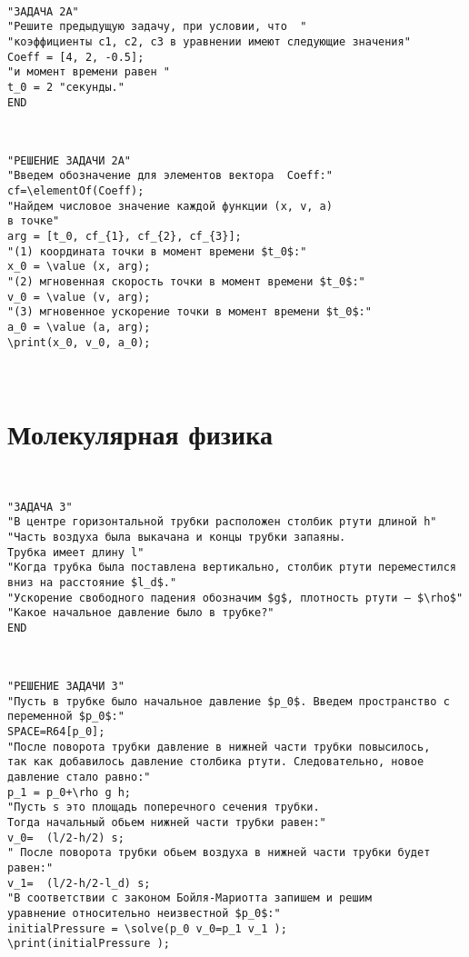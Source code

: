 \

\begin{verbatim}
"ЗАДАЧА 2А"
"Решите предыдущую задачу, при условии, что  "
"коэффициенты c1, c2, c3 в уравнении имеют следующие значения"
Coeff = [4, 2, -0.5];
"и момент времени равен "
t_0 = 2 "секунды." 
END
\end{verbatim}\vspace*{-3mm}

\

\begin{verbatim}
"РЕШЕНИЕ ЗАДАЧИ 2А"
"Введем обозначение для элементов вектора  Coeff:"
cf=\elementOf(Coeff);
"Найдем числовое значение каждой функции (x, v, a)
в точке"
arg = [t_0, cf_{1}, cf_{2}, cf_{3}];
"(1) координата точки в момент времени $t_0$:"
x_0 = \value (x, arg);
"(2) мгновенная скорость точки в момент времени $t_0$:"
v_0 = \value (v, arg);
"(3) мгновенное ускорение точки в момент времени $t_0$:"
a_0 = \value (a, arg);
\print(x_0, v_0, a_0);
\end{verbatim}\vspace*{-3mm}

\

\section{Молекулярная физика} 
 
 \
 
\begin{verbatim}
"ЗАДАЧА 3"
"В центре горизонтальной трубки расположен столбик ртути длиной h" 
"Часть воздуха была выкачана и концы трубки запаяны.   
Трубка имеет длину l" 
"Когда трубка была поставлена вертикально, столбик ртути переместился вниз на расстояние $l_d$." 
"Ускорение свободного падения обозначим $g$, плотность ртути — $\rho$"
"Какое начальное давление было в трубке?"
END
\end{verbatim}\vspace*{-3mm}

\

\begin{verbatim}
"РЕШЕНИЕ ЗАДАЧИ 3"
"Пусть в трубке было начальное давление $p_0$. Введем пространство с переменной $p_0$:"
SPACE=R64[p_0];
"После поворота трубки давление в нижней части трубки повысилось, 
так как добавилось давление столбика ртути. Следовательно, новое давление стало равно:" 
p_1 = p_0+\rho g h; 
"Пусть s это площадь поперечного сечения трубки. 
Тогда начальный обьем нижней части трубки равен:"
v_0=  (l/2-h/2) s; 
" После поворота трубки обьем воздуха в нижней части трубки будет  равен:"
v_1=  (l/2-h/2-l_d) s;
"В соответствии с законом Бойля-Мариотта запишем и решим 
уравнение относительно неизвестной $p_0$:"
initialPressure = \solve(p_0 v_0=p_1 v_1 );
\print(initialPressure );
\end{verbatim}

